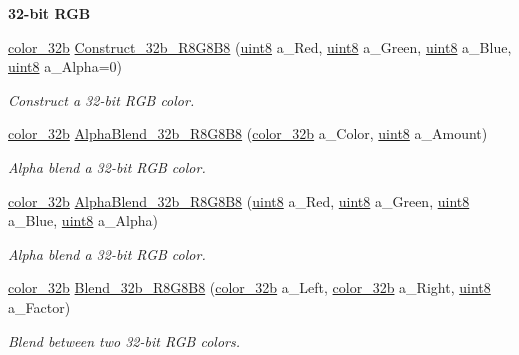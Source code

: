 \begin{Indent}{\bf 32-\/bit RGB}\par
\begin{DoxyCompactItemize}
\item 
\hyperlink{namespacetil_a8eb2d871b8a6ffb55b3eeb720207a6cb}{color\_\-32b} \hyperlink{namespacetil_ab7e7028c4a3c92cdca1a7b6dbf1c12bc}{Construct\_\-32b\_\-R8G8B8} (\hyperlink{namespacetil_a7a75b0e7e2cd3f19ea51c8c02fd242f8}{uint8} a\_\-Red, \hyperlink{namespacetil_a7a75b0e7e2cd3f19ea51c8c02fd242f8}{uint8} a\_\-Green, \hyperlink{namespacetil_a7a75b0e7e2cd3f19ea51c8c02fd242f8}{uint8} a\_\-Blue, \hyperlink{namespacetil_a7a75b0e7e2cd3f19ea51c8c02fd242f8}{uint8} a\_\-Alpha=0)
\begin{DoxyCompactList}\small\item\em Construct a 32-\/bit RGB color. \item\end{DoxyCompactList}\item 
\hyperlink{namespacetil_a8eb2d871b8a6ffb55b3eeb720207a6cb}{color\_\-32b} \hyperlink{namespacetil_afdfe84791f3958a513026bd931448eab}{AlphaBlend\_\-32b\_\-R8G8B8} (\hyperlink{namespacetil_a8eb2d871b8a6ffb55b3eeb720207a6cb}{color\_\-32b} a\_\-Color, \hyperlink{namespacetil_a7a75b0e7e2cd3f19ea51c8c02fd242f8}{uint8} a\_\-Amount)
\begin{DoxyCompactList}\small\item\em Alpha blend a 32-\/bit RGB color. \item\end{DoxyCompactList}\item 
\hyperlink{namespacetil_a8eb2d871b8a6ffb55b3eeb720207a6cb}{color\_\-32b} \hyperlink{namespacetil_aae7448d66a50340093fd0d7a17bc417d}{AlphaBlend\_\-32b\_\-R8G8B8} (\hyperlink{namespacetil_a7a75b0e7e2cd3f19ea51c8c02fd242f8}{uint8} a\_\-Red, \hyperlink{namespacetil_a7a75b0e7e2cd3f19ea51c8c02fd242f8}{uint8} a\_\-Green, \hyperlink{namespacetil_a7a75b0e7e2cd3f19ea51c8c02fd242f8}{uint8} a\_\-Blue, \hyperlink{namespacetil_a7a75b0e7e2cd3f19ea51c8c02fd242f8}{uint8} a\_\-Alpha)
\begin{DoxyCompactList}\small\item\em Alpha blend a 32-\/bit RGB color. \item\end{DoxyCompactList}\item 
\hyperlink{namespacetil_a8eb2d871b8a6ffb55b3eeb720207a6cb}{color\_\-32b} \hyperlink{namespacetil_ae4cb7b237e7e18881233e2230ce58cd5}{Blend\_\-32b\_\-R8G8B8} (\hyperlink{namespacetil_a8eb2d871b8a6ffb55b3eeb720207a6cb}{color\_\-32b} a\_\-Left, \hyperlink{namespacetil_a8eb2d871b8a6ffb55b3eeb720207a6cb}{color\_\-32b} a\_\-Right, \hyperlink{namespacetil_a7a75b0e7e2cd3f19ea51c8c02fd242f8}{uint8} a\_\-Factor)
\begin{DoxyCompactList}\small\item\em Blend between two 32-\/bit RGB colors. \item\end{DoxyCompactList}\end{DoxyCompactItemize}
\end{Indent}
